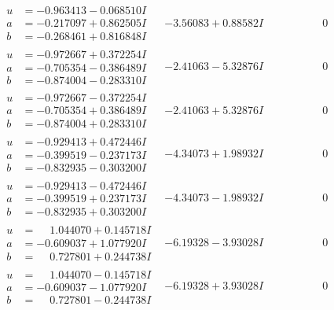 \documentclass[1p]{elsarticle_modified}
\theoremstyle{definition}
\begin{document}
$$\begin{array}{c|c|c}
\begin{aligned}
u &= -0.963413 - 0.068510 I \\
a &= -0.217097 + 0.862505 I \\
b &= -0.268461 + 0.816848 I\end{aligned}
 & -3.56083 + 0.88582 I & \phantom{-0.000000 } 0 \\ \hline\begin{aligned}
u &= -0.972667 + 0.372254 I \\
a &= -0.705354 - 0.386489 I \\
b &= -0.874004 - 0.283310 I\end{aligned}
 & -2.41063 - 5.32876 I & \phantom{-0.000000 } 0 \\ \hline\begin{aligned}
u &= -0.972667 - 0.372254 I \\
a &= -0.705354 + 0.386489 I \\
b &= -0.874004 + 0.283310 I\end{aligned}
 & -2.41063 + 5.32876 I & \phantom{-0.000000 } 0 \\ \hline\begin{aligned}
u &= -0.929413 + 0.472446 I \\
a &= -0.399519 - 0.237173 I \\
b &= -0.832935 - 0.303200 I\end{aligned}
 & -4.34073 + 1.98932 I & \phantom{-0.000000 } 0 \\ \hline\begin{aligned}
u &= -0.929413 - 0.472446 I \\
a &= -0.399519 + 0.237173 I \\
b &= -0.832935 + 0.303200 I\end{aligned}
 & -4.34073 - 1.98932 I & \phantom{-0.000000 } 0 \\ \hline\begin{aligned}
u &= \phantom{-}1.044070 + 0.145718 I \\
a &= -0.609037 + 1.077920 I \\
b &= \phantom{-}0.727801 + 0.244738 I\end{aligned}
 & -6.19328 - 3.93028 I & \phantom{-0.000000 } 0 \\ \hline\begin{aligned}
u &= \phantom{-}1.044070 - 0.145718 I \\
a &= -0.609037 - 1.077920 I \\
b &= \phantom{-}0.727801 - 0.244738 I\end{aligned}
 & -6.19328 + 3.93028 I & \phantom{-0.000000 } 0 \\ \hline\begin{aligned}

\end{aligned}
\end{array}$$
\end{document}
